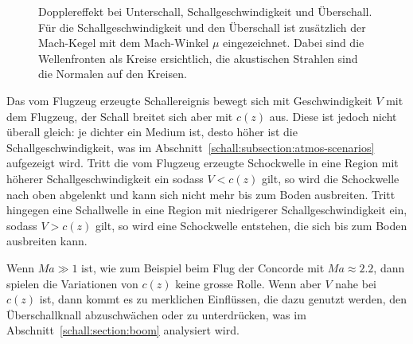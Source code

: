 \begin{figure}
    \centering
{}
    \caption{Dopplereffekt bei Unterschall, Schallgeschwindigkeit und Überschall.
    Für die Schallgeschwindigkeit und den Überschall ist zusätzlich der
    Mach-Kegel mit dem Mach-Winkel $\mu$ eingezeichnet. Dabei sind die
    Wellenfronten als Kreise ersichtlich, die akustischen Strahlen sind
    die Normalen auf den Kreisen.}
    \label{fig:schall:mach-zones}
\end{figure}
Das vom Flugzeug erzeugte Schallereignis bewegt sich mit Geschwindigkeit $V$
mit dem Flugzeug, der Schall breitet sich aber mit $c(z)$ aus.
Diese ist jedoch nicht überall gleich: je dichter ein Medium ist, desto
höher ist die Schallgeschwindigkeit, was im
Abschnitt~\ref{schall:subsection:atmos-scenarios} aufgezeigt wird.
Tritt die vom Flugzeug erzeugte Schockwelle in eine Region mit höherer
Schallgeschwindigkeit ein sodass $V<c(z)$ gilt, so wird die Schockwelle
nach oben abgelenkt und kann sich nicht mehr bis zum Boden ausbreiten.
Tritt hingegen eine Schallwelle in eine Region mit niedrigerer
Schallgeschwindigkeit ein, sodass $V>c(z)$ gilt, so wird eine Schockwelle
entstehen, die sich bis zum Boden ausbreiten kann.

Wenn $Ma \gg 1$ ist, wie zum Beispiel beim Flug der Concorde mit $\textit{Ma} \approx 2.2$,
%
dann spielen die Variationen von $c(z)$ keine grosse Rolle.
Wenn aber $V$ nahe bei $c(z)$ ist, dann kommt es zu merklichen Einflüssen,
die dazu genutzt werden, den Überschallknall abzuschwächen oder zu
unterdrücken, was im Abschnitt~\ref{schall:section:boom} analysiert wird.

